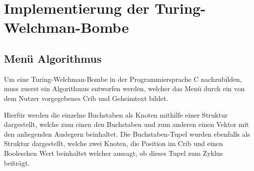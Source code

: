\chapter{Implementierung der Turing-Welchman-Bombe}\label{ch:impl_bombe}


%
\section{Menü Algorithmus}\label{sec:cycle-finding-algorithm}
Um eine Turing-Welchman-Bombe in der Programmiersprache C nachzubilden, muss zuerst ein Algorithmus entworfen werden, welcher das Menü durch ein von dem Nutzer vorgegebenes Crib und 
Geheimtext bildet.

Hierfür werden die einzelne Buchstaben als Knoten mithilfe einer Struktur dargestellt, welche zum einen den Buchstaben und zum anderen einen Vektor mit den anliegenden Auslegern beinhaltet. 
Die Buchstaben-Tupel wurden ebenfalls als Struktur dargestellt, welche zwei Knoten, die Position im Crib und einen Booleschen Wert beinhaltet welcher aussagt, ob dieses Tupel zum Zyklus beiträgt.



